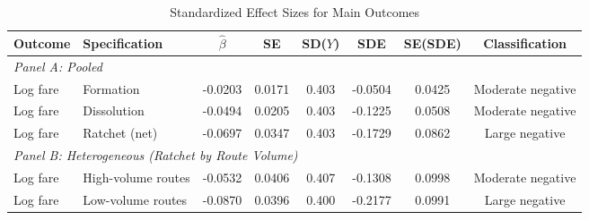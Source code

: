 \begin{table}[H]
\centering
\caption{Standardized Effect Sizes for Main Outcomes}
\label{tab:sde}
\begin{threeparttable}
\begin{adjustbox}{max width=\textwidth}
\begin{tabular}{llcccccc}
\toprule
Outcome & Specification & $\hat{\beta}$ & SE & SD($Y$) & SDE & SE(SDE) & Classification \\
\midrule
\multicolumn{8}{l}{\textit{Panel A: Pooled}} \\
Log fare & Formation & -0.0203 & 0.0171 & 0.403 & -0.0504 & 0.0425 & Moderate negative \\
Log fare & Dissolution & -0.0494 & 0.0205 & 0.403 & -0.1225 & 0.0508 & Moderate negative \\
Log fare & Ratchet (net) & -0.0697 & 0.0347 & 0.403 & -0.1729 & 0.0862 & Large negative \\
\midrule
\multicolumn{8}{l}{\textit{Panel B: Heterogeneous (Ratchet by Route Volume)}} \\
Log fare & High-volume routes & -0.0532 & 0.0406 & 0.407 & -0.1308 & 0.0998 & Moderate negative \\
Log fare & Low-volume routes & -0.0870 & 0.0396 & 0.400 & -0.2177 & 0.0991 & Large negative \\
\bottomrule
\end{tabular}
\end{adjustbox}
\par\vspace{0.3em}
{\footnotesize \begin{flushleft}

\end{flushleft}}
\end{threeparttable}
\end{table}
